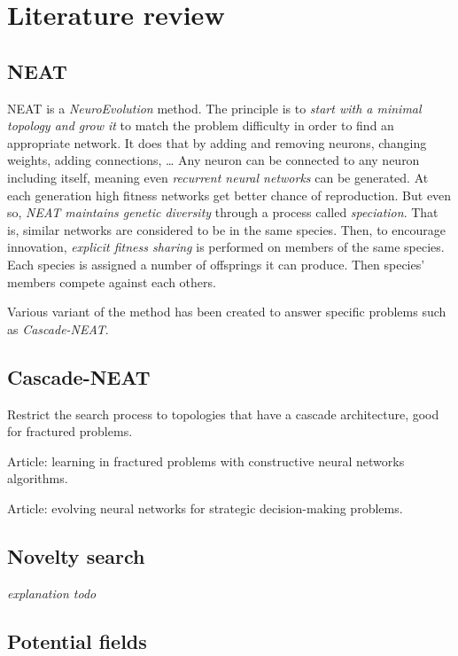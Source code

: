 \section{Literature review}\label{section:literature-review}

\subsection{NEAT}\label{subsec:neat}

NEAT is a \emph{NeuroEvolution} method. The principle is to \emph{start with a minimal topology and grow it} to match the problem difficulty in order to find an appropriate network.
It does that by adding and removing neurons, changing weights, adding connections, …
Any neuron can be connected to any neuron including itself, meaning even \emph{recurrent neural networks} can be generated.
At each generation high fitness networks get better chance of reproduction. But even so, \emph{NEAT maintains genetic diversity}
through a process called \emph{speciation}. That is, similar networks are considered to be in the same species. Then, to encourage innovation, \emph{explicit fitness sharing}
is performed on members of the same species. Each species is assigned a number of offsprings it can produce. Then species' members compete against each others. \cite{StMi02}

Various variant of the method has been created to answer specific problems such as \emph{Cascade-NEAT}.

\subsection{Cascade-NEAT}\label{subsec:cascade-neat}

Restrict the search process to topologies that have a cascade architecture, good for fractured problems.

Article: learning in fractured problems with constructive neural networks algorithms.

Article: evolving neural networks for strategic decision-making problems.

\subsection{Novelty search}\label{subsec:novelty-search}

\emph{explanation todo} \cite{LeSt11}

\subsection{Potential fields}\label{subsec:potential-fields}

